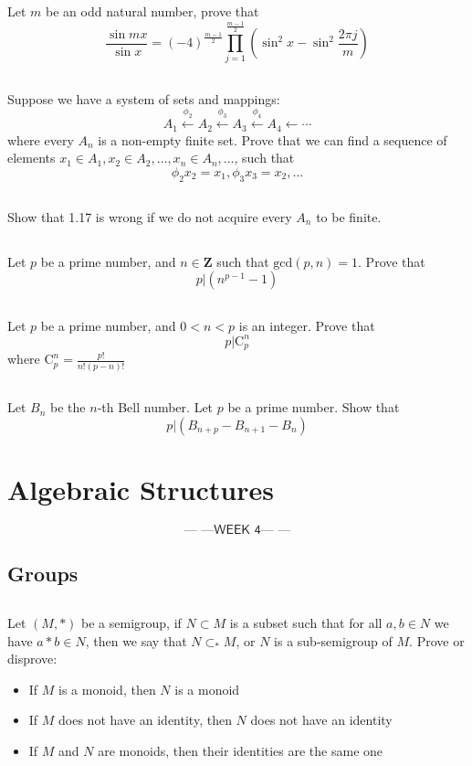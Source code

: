 \documentclass{report}
\newcommand{\week}[1]{$$\textsf{--- ---WEEK #1--- ---}$$}
\begin{document}
\section{}
Let $m$ be an odd natural number, prove that
\[\frac{\sin m x}{\sin x} = (-4)^{\frac{m-1}{2}} \prod_{j = 1}^{\frac{m-1}{2}}\left(\sin^2 x - \sin^2\frac{2\pi j}{m}\right)\]
\section{}
Suppose we have a system of sets and mappings:
\[A_1 \xleftarrow{\phi_2} A_2 \xleftarrow{\phi_3} A_3 \xleftarrow{\phi_4} A_4 \leftarrow \cdots\]
where every $A_n$ is a non-empty finite set. Prove that we can find a sequence of elements $x_1 \in A_1, x_2 \in A_2,\dots, x_n \in A_n, \dots$, such that
\[\phi_2 x_2 = x_1, \phi_3 x_3 = x_2, \dots\]
\section{}
Show that 1.17 is wrong if we do not acquire every $A_n$ to be finite.
\section{}
Let $p$ be a prime number, and $n \in \mathbf{Z}$ such that $\text{gcd}(p,n) = 1$. Prove that
\[p|(n^{p-1}-1)\]
\section{}
Let $p$ be a prime number, and $0<n<p$ is an integer. Prove that
\[p|\text{C}_p^n\]
where $\text{C}_p^n = \frac{p!}{n!(p-n)!}$
\section{}
Let $B_n$ be the $n$-th Bell number. Let $p$ be a prime number. Show that
\[p|(B_{n+p}-B_{n+1}-B_n)\]
\chapter{Algebraic Structures}
\week{4}
\section*{Groups}
\section{}
Let $(M,*)$ be a semigroup, if $N \subset M$ is a subset such that for all $a,b \in N$ we have $a*b \in N$, then we say that $N \mathop{\subset}_* M$, or $N$ is a sub-semigroup of $M$. Prove or disprove:
\begin{itemize}
\item If $M$ is a monoid, then $N$ is a monoid
\item If $M$ does not have an identity, then $N$ does not have an identity
\item If $M$ and $N$ are monoids, then their identities are the same one
\end{itemize}
\end{document}
